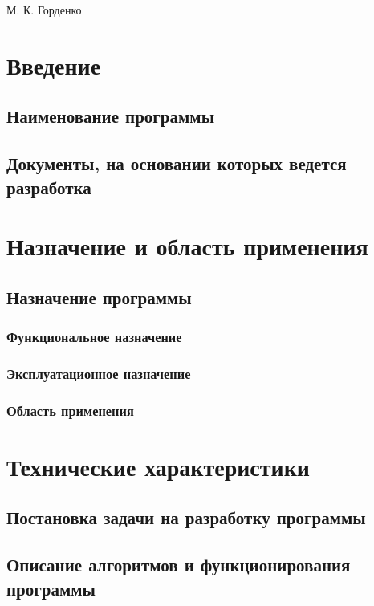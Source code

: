 \documentclass[a4paper,12pt]{article}
\begin{document}
	
	{М. К. Горденко}
	
	\firstPage
						\newpage
	\secondPage
						\newpage
	\thirdPage
						\newpage
	\section{Введение}
	\subsection{Наименование программы}
	\subsection{Документы, на основании которых ведется разработка}
	\newpage
	\section{Назначение и область применения}
	\subsection{Назначение программы }
	\subsubsection{Функциональное назначение }
	\subsubsection{Эксплуатационное назначение}
	\subsubsection{Область применения}
	
					\newpage 
	\section{Технические характеристики}
	\subsection{Постановка задачи на разработку программы}
	\subsection{Описание алгоритмов и функционирования программы}
\end{document}

